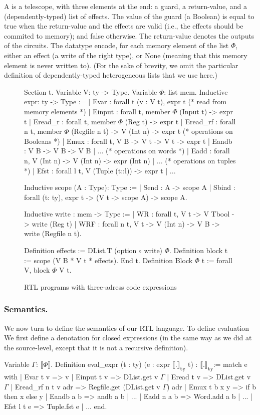 \documentclass{llncs}
\newcommand{\denote}[1]{\llbracket #1 \rrbracket}
\newcommand{\denotety}[1]{\denote{\mathtt{#1}}_{\mathtt{ty}}}
\begin{document}
A  is a telescope, with three elements at the end: a
guard, a return-value, and a (dependently-typed) list of effects. 
%
The value of the guard (a Boolean) is equal to true when the
return-value and the effects are valid (i.e., the effects should be
commited to memory); and false otherwise.
%
The return-value denotes the outputs of the circuits. 
%
The datatype  encode, for each memory element of the
list $\Phi$, either an effect (a write of the right type), or None
(meaning that this memory element is never written to). (For the sake
of brevity, we omit the particular definition of dependently-typed
heterogeneous lists  that we use here.)


\begin{figure}
  \centering
\begin{coq}
Section t. 
Variable V: ty -> Type. Variable $\Phi$: list mem. 
Inductive expr: ty -> Type :=
| Evar : forall t (v : V t), expr t
(* read from memory elements *)
| Einput : forall t, member $\Phi$ (Input t) -> expr t
| Eread_r : forall t, member $\Phi$ (Reg t) -> expr t
| Eread_rf : forall n t, member $\Phi$ (Regfile n t) -> V (Int n) -> expr t
(* operations on Booleans *)
| Emux : forall t, V B -> V t -> V t -> expr t
| Eandb : V B -> V B -> V B | ... 
(* operations on words *)
| Eadd : forall n, V (Int n) -> V (Int n) -> expr (Int n) | ... 
(* operations on tuples *)
| Efst : forall l t, V (Tuple (t::l)) -> expr t | ...

Inductive scope (A : Type): Type :=
| Send : A -> scope A
| Sbind : forall (t: ty), expr t -> (V t -> scope A) -> scope A. 

Inductive write : mem -> Type :=
| WR : forall t, V t -> V Tbool -> write (Reg t)
| WRF : forall n t, V t -> V (Int n) -> V B ->  write (Regfile n t). 
     
Definition effects := DList.T (option $\circ$ write) $\Phi$. 
Definition block t := scope (V B * V t *  effects).         
End t.
Definition Block $\Phi$ t := forall V, block $\Phi$ V t.
\end{coq}
  \caption{RTL programs with three-adress code expressions}
  \label{fig:rtl}
\end{figure}

\subsubsection{Semantics.} We now turn to define the semantics of our RTL
language. 
%
To define  evaluation 
We first define a denotation for closed expressions (in the
same way as we did at the source-level, except that it is not a
recursive definition).
\begin{coq}
Variable $\Gamma$: $\denote{\Phi}$. 
Definition eval_expr (t : ty) (e : expr $\denotety{.}$ t) : $\denotety{.}$:=
match e with
| Evar t v => v
| Einput t v => DList.get v $\Gamma$
| Eread  t v =>  DList.get v $\Gamma$
| Eread_rf n t v adr => Regfile.get (DList.get v $\Gamma$) adr
| Emux t b x y => if b then x else y 
| Eandb a b => andb a b | ...
| Eadd n a b => Word.add a b  | ...
| Efst l t e => Tuple.fst e | ...
end. 
\end{coq}
\end{document}

